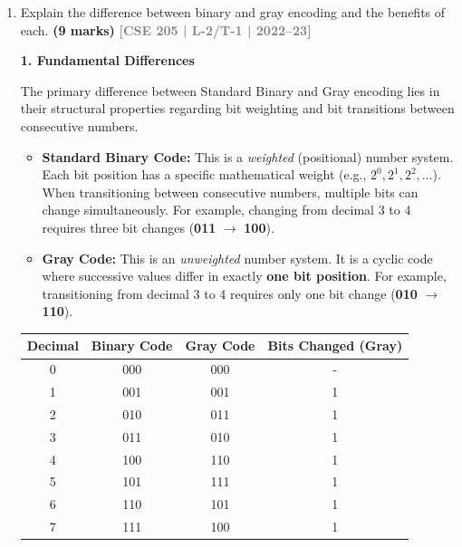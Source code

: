 \documentclass[12pt,a3paper]{article}
\newcommand{\yr}[1]{\hfill\textcolor{gray}{\small\textbf{[#1]}}}
\newcommand{\mk}[1]{\textcolor{orange!70!black}{\small\textbf{(#1 marks)}}}
\begin{document}
\begin{enumerate}
\begin{tcolorbox}[enhanced,breakable,ansbox,colback=cD!4,colframe=cD,boxrule=0.8pt,arc=5pt,title={\textbf{Answer}},fonttitle=\bfseries\color{white},colbacktitle=cD]
\end{tcolorbox}

\item Explain the difference between binary and gray encoding and the benefits of each.
\mk{9} \yr{CSE 205 | L-2/T-1 | 2022--23}

\begin{tcolorbox}[enhanced,breakable,ansbox,colback=cD!4,colframe=cD,boxrule=0.8pt,arc=5pt,title={\textbf{Answer}},fonttitle=\bfseries\color{white},colbacktitle=cD]

\textbf{\textcolor{cD}{1. Fundamental Differences}}

The primary difference between Standard Binary and Gray encoding lies in their structural properties regarding bit weighting and bit transitions between consecutive numbers.

\begin{itemize}
    \item \textbf{Standard Binary Code:} This is a \textit{weighted} (positional) number system. Each bit position has a specific mathematical weight (e.g., $2^0, 2^1, 2^2, \dots$). When transitioning between consecutive numbers, multiple bits can change simultaneously. For example, changing from decimal 3 to 4 requires three bit changes (\textbf{011} $\rightarrow$ \textbf{100}).
    \item \textbf{Gray Code:} This is an \textit{unweighted} number system. It is a cyclic code where successive values differ in exactly \textbf{one bit position}. For example, transitioning from decimal 3 to 4 requires only one bit change (\textbf{010} $\rightarrow$ \textbf{110}).
\end{itemize}

\vspace{0.5em}
\begin{center}
\begin{tabular}{cccc}
\toprule
\textbf{Decimal} & \textbf{Binary Code} & \textbf{Gray Code} & \textbf{Bits Changed (Gray)} \\
\midrule
0 & 000 & 000 & - \\
1 & 001 & 001 & 1 \\
2 & 010 & 011 & 1 \\
3 & 011 & 010 & 1 \\
4 & 100 & 110 & 1 \\
5 & 101 & 111 & 1 \\
6 & 110 & 101 & 1 \\
7 & 111 & 100 & 1 \\
\bottomrule
\end{tabular}
\end{center}


\end{tcolorbox}
\end{enumerate}
\end{document}
